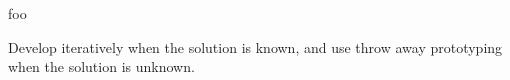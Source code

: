 
foo




Develop iteratively when the solution is known, and use throw away prototyping when the solution is unknown.




